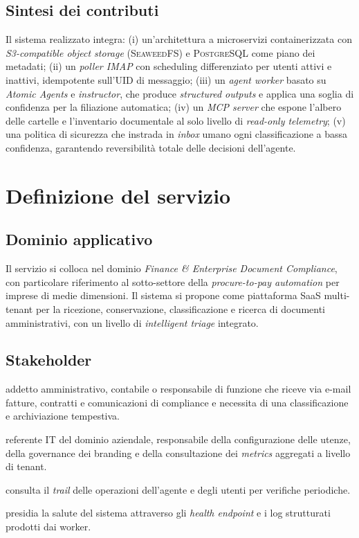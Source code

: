 \documentclass[11pt,a4paper,oneside]{article}
\begin{document}
\subsection{Sintesi dei contributi}
Il sistema realizzato integra:
(i) un'architettura a microservizi containerizzata con \emph{S3-compatible object
storage} (\textsc{SeaweedFS}) e \textsc{PostgreSQL} come piano dei metadati;
(ii) un \emph{poller IMAP} con scheduling differenziato per utenti attivi e inattivi,
idempotente sull'\textsc{UID} di messaggio;
(iii) un \emph{agent worker} basato su \emph{Atomic Agents} e \emph{instructor},
che produce \emph{structured outputs} e applica una soglia di confidenza per la
filiazione automatica;
(iv) un \emph{MCP server} che espone l'albero delle cartelle e l'inventario
documentale al solo livello di \emph{read-only telemetry};
(v) una politica di sicurezza che instrada in \emph{inbox} umano ogni
classificazione a bassa confidenza, garantendo reversibilit\`a totale delle
decisioni dell'agente.

\section{Definizione del servizio}

\subsection{Dominio applicativo}
Il servizio si colloca nel dominio \emph{Finance \& Enterprise Document
Compliance}, con particolare riferimento al sotto-settore della
\emph{procure-to-pay automation} per imprese di medie dimensioni. Il sistema
si propone come piattaforma SaaS multi-tenant per la ricezione, conservazione,
classificazione e ricerca di documenti amministrativi, con un livello di
\emph{intelligent triage} integrato.

\subsection{Stakeholder}
\begin{description}[leftmargin=*]
    \item[Utente finale (knowledge worker)] addetto amministrativo, contabile o
          responsabile di funzione che riceve via e-mail fatture, contratti e
          comunicazioni di compliance e necessita di una classificazione e
          archiviazione tempestiva.
    \item[Domain administrator] referente IT del dominio aziendale, responsabile
          della configurazione delle utenze, della governance dei branding e
          della consultazione dei \emph{metrics} aggregati a livello di tenant.
    \item[Auditor / Compliance officer] consulta il \emph{trail} delle
          operazioni dell'agente e degli utenti per verifiche periodiche.
    \item[Operatore di piattaforma] presidia la salute del sistema attraverso
          gli \emph{health endpoint} e i log strutturati prodotti dai worker.
\end{description}
\end{document}
